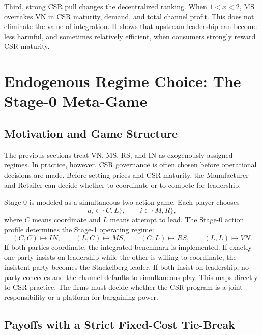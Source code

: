 Third, strong CSR pull changes the decentralized ranking. When $1<x<2$, MS overtakes VN in CSR maturity, demand, and total channel profit. This does not eliminate the value of integration. It shows that upstream leadership can become less harmful, and sometimes relatively efficient, when consumers strongly reward CSR maturity.

\section{Endogenous Regime Choice: The Stage-0 Meta-Game}
\label{sec:meta_game}

\subsection{Motivation and Game Structure}

The previous sections treat VN, MS, RS, and IN as exogenously assigned regimes. In practice, however, CSR governance is often chosen before operational decisions are made. Before setting prices and CSR maturity, the Manufacturer and Retailer can decide whether to coordinate or to compete for leadership.

Stage 0 is modeled as a simultaneous two-action game. Each player chooses
\begin{equation*}
    a_i\in\{C,L\},\qquad i\in\{M,R\},
\end{equation*}
where $C$ means coordinate and $L$ means attempt to lead. The Stage-0 action profile determines the Stage-1 operating regime:
\begin{equation*}
    (C,C)\mapsto IN,
    \qquad
    (L,C)\mapsto MS,
    \qquad
    (C,L)\mapsto RS,
    \qquad
    (L,L)\mapsto VN.
\end{equation*}
If both parties coordinate, the integrated benchmark is implemented. If exactly one party insists on leadership while the other is willing to coordinate, the insistent party becomes the Stackelberg leader. If both insist on leadership, no party concedes and the channel defaults to simultaneous play. This maps directly to CSR practice. The firms must decide whether the CSR program is a joint responsibility or a platform for bargaining power.

\subsection{Payoffs with a Strict Fixed-Cost Tie-Break}

